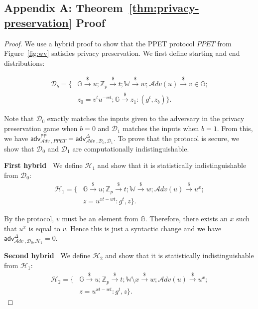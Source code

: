 \documentclass[letterpaper,twocolumn,10pt]{article}
\newcommand{\alg}[1]{\mathsf{#1}}
\newcommand{\adv}{\mathcal{A}dv}
\newcommand{\riar}{\xrightarrow{\$}}
\newcommand{\ZZ}{\mathbb{Z}}
\newcommand{\WW}{\mathbb{W}}
\newcommand{\GG}{\mathbb{G}}
\newcommand{\DD}{\mathcal{D}}
\newcommand{\HH}{\mathcal{H}}
\newcommand{\advantage}[2]{\alg{adv}^{#1}_{\adv\;\!,#2}}
\newcommand{\mypara}[1]{\vspace{.5em}\noindent\textbf{{#1}~}}
\begin{document}
\begin{appendices}

\section*{Appendix A: Theorem~\ref{thm:privacy-preservation} Proof}
\label{app:ppet-proof}
\begin{proof}
  We use a hybrid proof to show that the PPET protocol $\mathit{PPET}$ from Figure~\ref{fig:wv}
  satisfies privacy preservation. We first define starting and end distributions:

  \begin{equation}
    \begin{split}
      \DD_b = \{& \GG \riar u; \ZZ_p \riar t; \WW \riar w; \adv(u) \riar v \in \GG; \\
                & z_0 = v^t u^{-wt}; \GG \riar z_1 : (g^t, z_b) \}.
    \end{split}
  \end{equation}

  Note that $\DD_0$ exactly matches the inputs given to the
  adversary in the privacy preservation game when $b = 0$ and
  $\DD_1$ matches the inputs when $b = 1$. From this, we have
  $\advantage{\mathsf{PP}}{\mathit{PPET}} =
  \advantage{\Delta}{\DD_0, \DD_1}$. To prove that the
  protocol is secure, we show that $\DD_0$ and $\DD_1$ are
  computationally indistinguishable.

  \mypara{First hybrid} We define $\HH_1$ and show that it is
  statistically indistinguishable from $\DD_0$:
  \begin{equation}
    \begin{split}
      \HH_1 = \{& \GG \riar u; \ZZ_p \riar t; \WW \riar w; \adv(u) \riar u^{x}; \\
                & z = u^{xt - wt} : g^t, z \}.
    \end{split}
  \end{equation}

  By the protocol, $v$ must be an element from $\GG$. Therefore,
  there exists an $x$ such that $u^{x}$ is equal to $v$. Hence this is just a syntactic change and we have
  $\advantage{\Delta}{\DD_0, \HH_1} = 0$.

  \mypara{Second hybrid} We define $\HH_2$ and show that it is
  statistically indistinguishable from $\HH_1$:
  \begin{equation}
    \begin{split}
      \HH_2 = \{& \GG \riar u; \ZZ_p \riar t; \WW \setminus x \riar w; \adv(u) \riar u^{x}; \\
                & z = u^{xt - wt} : g^t, z \}.
    \end{split}
  \end{equation}


\end{proof}
\end{appendices}
\end{document}
